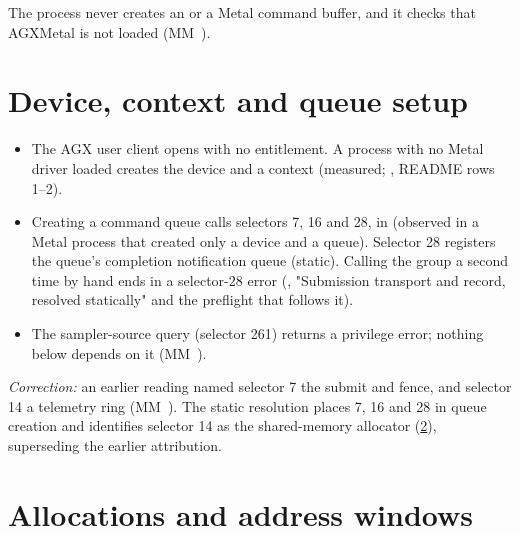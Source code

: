 The process never creates an  or a Metal command buffer, and it checks that AGXMetal is not loaded
(MM~).

\section{Device, context and queue setup}\label{sec:opening-device-contexts}

\begin{itemize}
\item The AGX user client opens with no entitlement. A process with no Metal driver loaded creates the device and a
  context (measured; , README rows 1–2).
\item Creating a command queue calls selectors 7, 16 and 28, in  (observed in a Metal process that
  created only a device and a queue). Selector 28 registers the queue's completion notification queue (static). Calling
  the group a second time by hand ends in a selector-28 error (, "Submission transport
  and record, resolved statically" and the preflight that follows it).
\item The sampler-source query (selector 261) returns a privilege error; nothing below depends on it (MM~).
\end{itemize}

\emph{Correction:} an earlier reading named selector 7 the submit and fence, and selector 14 a telemetry ring (MM~). The
static resolution places 7, 16 and 28 in queue creation and identifies selector 14 as the shared-memory allocator
(\cref{sec:memory-allocations-shared}), superseding the earlier attribution.

\section{Allocations and address windows}\label{sec:memory-allocations-shared}

